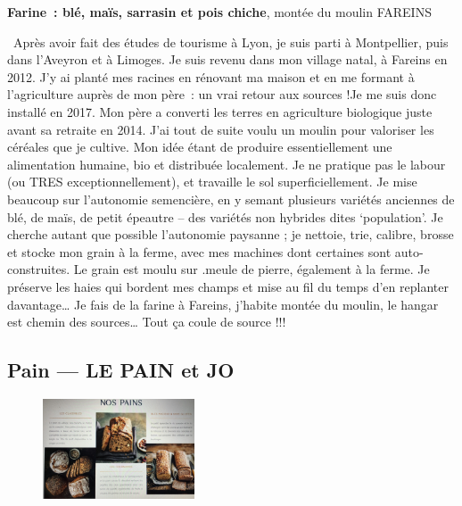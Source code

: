 \documentclass[8pt,a4paper,french]{article}
\makeatletter
\newcommand{\authoredby}[1]{\addtocontents{toc}{\protect\@nameuse{authoredby#1}}}%
\makeatother
\begin{document}
\newline
{\bf Farine\ : blé, maïs, sarrasin et pois chiche}, montée du moulin FAREINS\newline

\noindent\guillemotleft\ Après avoir fait des études de tourisme à
Lyon, je suis parti à Montpellier, puis dans l’Aveyron et à
Limoges. Je suis revenu dans mon village natal, à Fareins en 2012. J’y
ai planté mes racines en rénovant ma maison et en me formant à
l’agriculture auprès de mon père\ : un vrai retour aux sources !Je me
suis donc installé en 2017. Mon père a converti les terres en
agriculture biologique juste avant sa retraite en 2014. J’ai tout de
suite voulu un moulin pour valoriser les céréales que je cultive. Mon
idée étant de produire essentiellement une alimentation humaine, bio
et distribuée localement.  Je ne pratique pas le labour (ou TRES
exceptionnellement), et travaille le sol superficiellement. Je mise
beaucoup sur l’autonomie semencière, en y semant plusieurs variétés
anciennes de blé, de maïs, de petit épeautre – des variétés non
hybrides dites ‘population’. Je cherche autant que possible
l’autonomie paysanne ; je nettoie, trie, calibre, brosse et stocke mon
grain à la ferme, avec mes machines dont certaines sont
auto-construites. Le grain est moulu sur .meule de pierre, également à
la ferme.  Je préserve les haies qui bordent mes champs et mise au fil
du temps d’en replanter davantage…  Je fais de la farine à Fareins,
j’habite montée du moulin, le hangar est chemin des sources…  Tout ça
coule de source !!! \guillemotright

\newpage

\authoredby{B}
\subsection{Pain --- LE PAIN et JO}\label{subsec:pain}

\begin{figure}
\includegraphics[width=0.4\textwidth]{Pain.jpg}
\end{figure}
\end{document}
